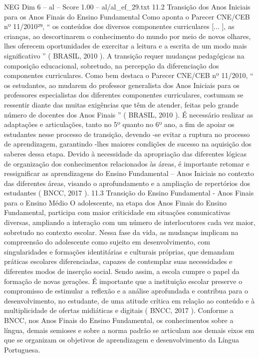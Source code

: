 \begin{textsample}{NEG Dim 6 – al – Score 1.00 – al/al\_ef\_29.txt}  \label{ex:f6_neg_067}
11.2 Transição dos Anos Iniciais para os Anos Finais do Ensino Fundamental Como aponta o Parecer CNE/CEB nº 11/2010²⁹, “ os conteúdos dos diversos componentes curriculares [... ], as crianças, ao descortinarem o conhecimento do mundo por meio de novos olhares, lhes oferecem oportunidades de exercitar a leitura e a escrita de um modo mais significativo ” ( BRASIL, 2010 ).
A transição requer mudanças pedagógicas na composição educacional, sobretudo, na percepção da diferenciação dos componentes curriculares.
Como bem destaca o Parecer CNE/CEB nº 11/2010, “ os estudantes, ao mudarem do professor generalista dos Anos Iniciais para os professores especialistas dos diferentes componentes curriculares, costumam se ressentir diante das muitas exigências que têm de atender, feitas pelo grande número de docentes dos Anos Finais ” ( BRASIL, 2010 ).
É necessário realizar as adaptações e articulações, tanto no 5º quanto no 6º ano, a fim de apoiar os estudantes nesse processo de transição, devendo -se evitar a ruptura no processo de aprendizagem, garantindo -lhes maiores condições de sucesso na aquisição dos saberes dessa etapa.
Devido à necessidade da apropriação das diferentes lógicas de organização dos conhecimentos relacionados às áreas, é importante retomar e ressignificar as aprendizagens do Ensino Fundamental – Anos Iniciais no contexto das diferentes áreas, visando o aprofundamento e a ampliação de repertórios dos estudantes ( BNCC, 2017 ). 11.3 Transição do Ensino Fundamental - Anos Finais para o Ensino Médio O adolescente, na etapa dos Anos Finais do Ensino Fundamental, participa com maior criticidade em situações comunicativas diversas, ampliando a interação com um número de interlocutores cada vez maior, sobretudo no contexto escolar.
Nessa fase da vida, as mudanças implicam na compreensão do adolescente como sujeito em desenvolvimento, com singularidades e formações identitárias e culturais próprias, que demandam práticas escolares diferenciadas, capazes de contemplar suas necessidades e diferentes modos de inserção social.
Sendo assim, a escola cumpre o papel da formação de novas gerações.
É importante que a instituição escolar preserve o compromisso de estimular a reflexão e a análise aprofundada e contribua para o desenvolvimento, no estudante, de uma atitude crítica em relação ao conteúdo e à multiplicidade de ofertas midiáticas e digitais ( BNCC, 2017 ).
Conforme a BNCC, nos Anos Finais do Ensino Fundamental, os conhecimentos sobre a língua, demais semioses e sobre a norma padrão se articulam aos demais eixos em que se organizam os objetivos de aprendizagem e desenvolvimento da Língua Portuguesa.

\end{textsample}
